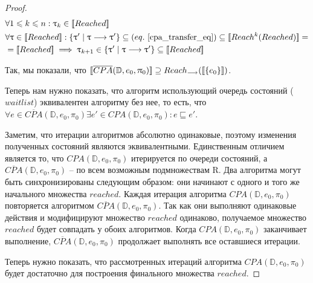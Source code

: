 \begin{proof}
\begin{align}
& \forall 1 \leq k \leq n: \tau_k \in \conc{Reached} \nonumber \\ 
& \forall \tau \in \conc{Reached}: \{\tau' \mid \tau \tcarrow \tau'\} \subseteq (eq.~\ref{cpa_transfer_eq}) \subseteq \conc{Reach^k(Reached)} = \\
& = \conc{Reached} \implies \tau_{k+1} \in \{\tau' \mid \tau \tcarrow \tau'\} \subseteq \conc{Reached} \nonumber
\end{align}

Так, мы показали, что $[\![ \overline{CPA}(\mathbb{D}, e_0, \uppi_0) ]\!] \supseteq Reach_{\longrightarrow}([\![ \{e_0\} ]\!])$.


Теперь нам нужно показать, что алгоритм использующий очередь состояний ($waitlist$) эквивалентен алгоритму без нее, то есть, что $\forall e \in \overline{CPA}(\mathbb{D}, e_0, \pi_0) \exists e' \in CPA(\mathbb{D}, e_0, \pi_0): e \sqsubseteq e'$.

Заметим, что итерации алгоритмов абсолютно одинаковые, поэтому изменения полученных состояний являются эквивалентными.
Единственным отличием является то, что $CPA(\mathbb{D}, e_0, \pi_0)$ итерируется по очереди состояний, а $\overline{CPA}(\mathbb{D}, e_0, \pi_0)$ -- по всем возможным подмножествам R.
Два алгоритма могут быть синхронизированы следующим образом: они начинают с одного и того же начального множества $reached$. 
Каждая итерация алгоритма $CPA(\mathbb{D}, e_0, \pi_0)$ повторяется алгоритмом $\overline{CPA}(\mathbb{D}, e_0, \pi_0)$. 
Так как они выполняют одинаковые действия и модифицируют множество $reached$ одинаково, получаемое множество $reached$ будет совпадать у обоих алгоритмов.
Когда $CPA(\mathbb{D}, e_0, \pi_0)$ заканчивает выполнение, $\overline{CPA}(\mathbb{D}, e_0, \pi_0)$ продолжает выполнять все оставшиеся итерации.

Теперь нужно показать, что рассмотренных итераций алгоритма $CPA(\mathbb{D}, e_0, \pi_0)$ будет достаточно для построения финального множества $reached$.


\end{proof}
